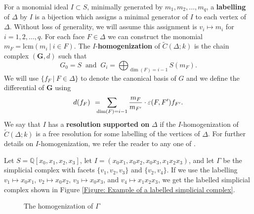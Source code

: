 \documentclass[12pt,leqno]{amsart}
\theoremstyle{definition}
\begin{document}
For a monomial ideal $I \subset S$, minimally generated by
$m_1,m_2,\dotsc,m_q$, a \textbf{labelling} of $\Delta$ by $I$ is a bijection
which assigns a minimal generator of $I$ to each vertex of $\Delta$. Without
loss of generality, we will assume this assignment is $v_i \longmapsto m_i$
for $i = 1,2,\dotsc,q$. For each face $F \in \Delta$ we can construct the
monomial $m_F = \mathrm{lcm}(m_i \ | \ i \in F )$. The
$I$-\textbf{homogenization} of $\widetilde{C} (\Delta;k)$ is the chain complex
$(\mathbf G, d)$ such that
%
\begin{displaymath}
  G_0 = S \ \text{ and } \ G_i = \bigoplus_{\dim(F) = i-1}S(m_F).
\end{displaymath}
%
We will use $\{f_F \ | \ F \in \Delta \}$ to denote the canonical basis of $G$ and we define the differential of $\mathbf G$ using
%
\begin{displaymath}
  d(f_F) \hspace{4pt} = \hspace{-8pt} \sum_{\dim(F) = i-1} \frac{m_F}{m_{F'}} \cdot \varepsilon(F,F') f_{F'}.
\end{displaymath}
%
We say that $I$ has a \textbf{resolution supported on} $\Delta$ if the
$I$-homogenization of $\widetilde C(\Delta; k)$ is a free resolution for some
labelling of the vertices of $\Delta$. For further details on
$I$-homogenization, we refer the reader to any one of \cites{MS, Peeva}.


Let $S = \mathbb Q[x_0,x_1,x_2,x_3]$, let
$I = (x_0x_1,x_0x_2,x_0x_3,x_1x_2x_3)$, and let $\Gamma$ be the simplicial
complex with facets $\{ v_1,v_2,v_3 \}$ and $\{ v_2, v_4 \}$.  If we use the
labelling $v_1 \longmapsto x_0x_1$, $v_2 \longmapsto x_0x_2$,
$v_3 \longmapsto x_0x_3$, and $v_4 \longmapsto x_1x_2x_3$, we get the labelled
simplicial complex shown in Figure \ref{Figure: Example of a labelled
  simplicial complex}.

\begin{figure}[h]\centering
  \caption{The homogenization of $\Gamma$}
  \label{Figure: Example of a labelled simplicial complex}
\end{figure}
\end{document}
